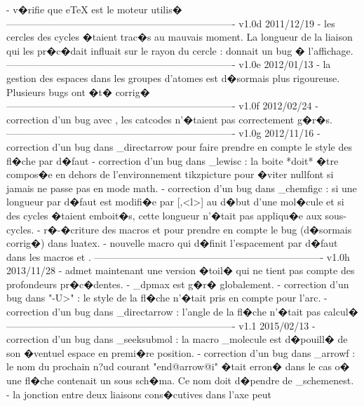     - v�rifie que eTeX est le moteur utilis�
----------------------------------------------------------------------
v1.0d      2011/12/19
    - les cercles des cycles �taient trac�s au mauvais moment. La
      longueur de la liaison qui les pr�c�dait influait sur le
      rayon du cercle :  donnait un bug
      � l'affichage.
----------------------------------------------------------------------
v1.0e      2012/01/13
    - la gestion des espaces dans les groupes d'atomes est
      d�sormais plus rigoureuse. Plusieurs bugs ont �t�
      corrig�
----------------------------------------------------------------------
v1.0f      2012/02/24
    - correction d'un bug avec , les catcodes n'�taient
      pas correctement g�r�s.
----------------------------------------------------------------------
v1.0g      2012/11/16
    - correction d'un bug dans \CF_directarrow pour faire prendre en
      compte le style des fl�che par d�faut
    - correction d'un bug dans \CF_lewisc : la boite *doit* �tre
      compos�e en dehors de l'environnement tikzpicture pour
      �viter nullfont si jamais \printatom ne passe pas en mode
      math.
    - correction d'un bug dans \CF_chemfigc : si une longueur par
      d�faut est modifi�e par [,<l>] au d�but d'une mol�cule
      et si des cycles �taient emboit�s, cette longueur n'�tait
      pas appliqu�e aux sous-cycles.
    - r�-�criture des macros \chemabove et \chembemow pour
      prendre en compte le bug (d�sormais corrig�) dans luatex.
    - nouvelle macro \setstacksep qui d�finit l'espacement par
      d�faut dans les macros \chemabove et \chembelow.
----------------------------------------------------------------------
v1.0h      2013/11/28
    - \chemname admet maintenant une version �toil� qui ne tient
      pas compte des profondeurs pr�c�dentes.
    - \CF_dpmax est g�r� globalement.
    - correction d'un bug dans "-U>" : le style de la fl�che
      n'�tait pris en compte pour l'arc.
    - correction d'un bug dans \CF_directarrow : l'angle de la
      fl�che n'�tait pas calcul�
----------------------------------------------------------------------
v1.1       2015/02/13
    - correction d'un bug dans \CF_seeksubmol : la macro
      \CF_molecule est d�pouill� de son �ventuel espace
      en premi�re position.
    - correction d'un bug dans \CF_arrowf : le nom du prochain
      n?ud courant "end@arrow@i" �tait erron� dans le cas o� une
      fl�che contenait un sous sch�ma. Ce nom doit d�pendre de
      \CF_schemenest.
    - la jonction entre deux liaisons cons�cutives dans l'axe peut
